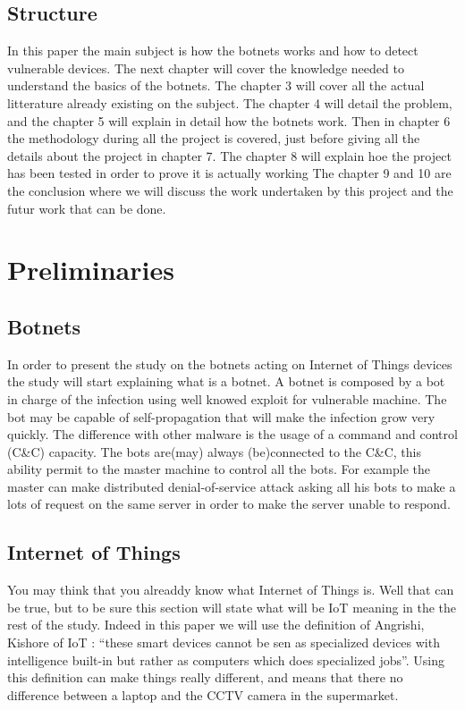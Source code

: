 \documentclass{report}
\begin{document}
\section{Structure}
In this paper the main subject is how the botnets works and how to detect vulnerable devices.\newline
The next chapter will cover the knowledge needed to understand the basics of the botnets. The chapter 3 will cover all the actual litterature already existing on the subject.\newline
The chapter 4 will detail the problem, and the chapter 5 will explain in detail how the botnets work.\newline
Then in chapter 6 the methodology during all the project is covered, just before giving all the details about the project in chapter 7. The chapter 8 will explain hoe the project has been tested in order to prove it is actually working\newline
The chapter 9 and 10 are the conclusion where we will discuss the work undertaken by this project and the futur work that can be done. 

\chapter{Preliminaries}
\section{Botnets}
In order to present the study on the botnets acting on Internet of Things devices the study will start explaining what is a botnet. A botnet is composed by a bot in charge of the infection using well knowed exploit for vulnerable machine. The bot may be capable of self-propagation that will make the infection grow very quickly. The difference with other malware is the usage of a command and control (C\&C) capacity. The bots are(may) always (be)connected to the C\&C, this ability permit to the master machine to control all the bots. For example the master can make distributed denial-of-service attack asking all his bots to make a lots of request on the same server in order to make the server unable to respond.

\section{Internet of Things}
\label{sec:preiot}
You may think that you alreaddy know what Internet of Things is. Well that can be true, but to be sure this section will state what will be IoT meaning in the the rest of the study. Indeed in this paper we will use the definition of Angrishi, Kishore \autocite{angrishi2017turning} of IoT : ``these smart devices cannot be sen as specialized devices with intelligence built-in but rather as computers which does specialized jobs''. Using this definition can make things really different, and means that there no difference between a laptop and the CCTV camera in the supermarket.
\end{document}
